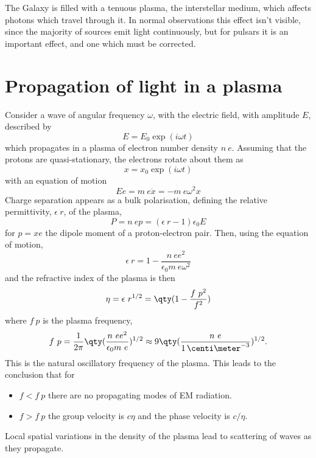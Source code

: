 The Galaxy is filled with a tenuous plasma, the interstellar medium,
which affects photons which travel through it. In normal observations
this effect isn't visible, since the majority of sources emit light
continuously, but for pulsars it is an important effect, and one which
must be corrected.

\section{Propagation of light in a plasma}
\label{sec:prop-light-plasma}

Consider a wave of angular frequency $\omega$, with the electric
field, with amplitude $E$, described by
\begin{equation}
  \label{eq:100}
  E = E_0 \exp(i \omega t)
\end{equation}
which propagates in a plasma of electron number density
$n~e$. Assuming that the protons are quasi-stationary, the electrons
rotate about them as
\[ x = x_0 \exp(i \omega t) \]
with an equation of motion
\begin{equation}
  \label{eq:101}
  E e = m~e \ddot{x} = -m~e \omega^2 x 
\end{equation}
Charge separation appears as a bulk polarisation, defining the
relative permittivity, $\epsilon~r$, of the plasma,
\begin{equation}
  \label{eq:102}
  P = n~e p = (\epsilon~r -1) \epsilon_0 E
\end{equation} 
for $p = xe$ the dipole moment of a proton-electron pair. Then, using
the equation of motion,
\begin{equation}
  \label{eq:103}
  \epsilon~r = 1 - \frac{n~e e^2}{\epsilon_0 m~e \omega^2}
\end{equation}
and the refractive index of the plasma is then
\begin{equation}
  \label{eq:104}
  \eta = \epsilon~r^{1/2} = \qty( 1 - \frac{f~p^2}{f^2} )
\end{equation}
where $f~p$ is the plasma frequency, 
\[f~p = \frac{1}{2 \pi} \qty( \frac{n~e e^2}{\epsilon_0 m~e})^{1/2}
\approx 9 \qty( \frac{n~e}{1\,\centi\meter^{-3}})^{1/2}. \] This is
the natural oscillatory frequency of the plasma. This leads to the
conclusion that for
\begin{itemize}
\item $f<f~p$ there are no propagating modes of EM radiation.
\item $f>f~p$ the group velocity is $c \eta$ and the phase velocity is
  $c/\eta$.
\end{itemize}
Local spatial variations in the density of the plasma lead to
scattering of waves as they propagate.

